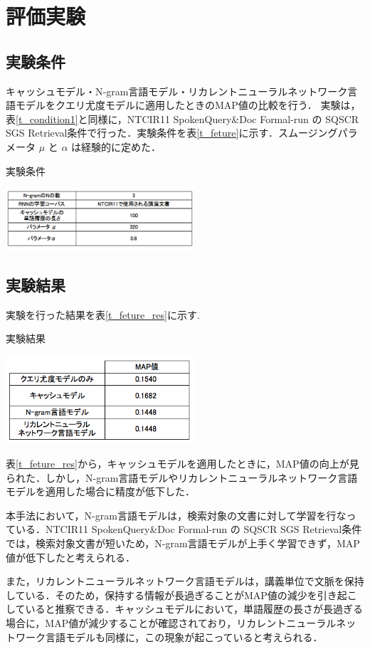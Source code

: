 \section{評価実験}
\subsection{実験条件}

キャッシュモデル・N-gram言語モデル・リカレントニューラルネットワーク言語モデルをクエリ尤度モデルに適用したときのMAP値の比較を行う．
実験は，表\ref{t_condition1}と同様に，NTCIR11 SpokenQuery\&Doc Formal-run の SQSCR SGS Retrieval条件で行った．実験条件を表\ref{t_feture}に示す．スムージングパラメータ $\mu$ と $\alpha$ は経験的に定めた．

\begin{table}[h]
    \centering
    \caption{実験条件}
    \includegraphics[width=7cm]{./image/t_feature1_1.png}
    \label{t_feture}
\end{table}

\subsection{実験結果}

実験を行った結果を表\ref{t_feture_res}に示す.

\begin{table}[h]
    \centering
    \caption{実験結果}
    \includegraphics[width=7cm]{./image/t_feature2_1.png}
    \label{t_feture_res}
\end{table}

表\ref{t_feture_res}から，キャッシュモデルを適用したときに，MAP値の向上が見られた．しかし，N-gram言語モデルやリカレントニューラルネットワーク言語モデルを適用した場合に精度が低下した． 

本手法において，N-gram言語モデルは，検索対象の文書に対して学習を行なっている．NTCIR11 SpokenQuery\&Doc Formal-run の SQSCR SGS Retrieval条件では，検索対象文書が短いため，N-gram言語モデルが上手く学習できず，MAP値が低下したと考えられる．

また，リカレントニューラルネットワーク言語モデルは，講義単位で文脈を保持している．そのため，保持する情報が長過ぎることがMAP値の減少を引き起こしていると推察できる．キャッシュモデルにおいて，単語履歴の長さが長過ぎる場合に，MAP値が減少することが確認されており，リカレントニューラルネットワーク言語モデルも同様に，この現象が起こっていると考えられる．